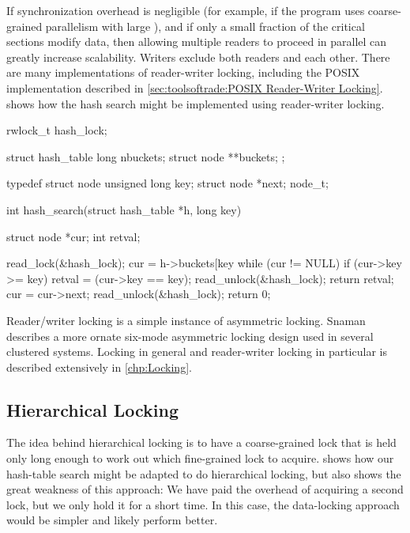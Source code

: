 If synchronization overhead is negligible (for example, if the program
uses coarse-grained parallelism with large ), and if
only a small fraction of the critical sections modify data, then allowing
multiple readers to proceed in parallel can greatly increase scalability.
Writers exclude both readers and each other.
There are many implementations of reader-writer locking, including
the POSIX implementation described in
\cref{sec:toolsoftrade:POSIX Reader-Writer Locking}.
shows how the hash search might be implemented using reader-writer locking.

\begin{listing}
\begin{VerbatimL}[commandchars=\\\@\$]
rwlock_t hash_lock;

struct hash_table
{
	long nbuckets;
	struct node **buckets;
};

typedef struct node {
	unsigned long key;
	struct node *next;
} node_t;

int hash_search(struct hash_table *h, long key)
{
	struct node *cur;
	int retval;

	read_lock(&hash_lock);
	cur = h->buckets[key %
	while (cur != NULL) {
		if (cur->key >= key) {
			retval = (cur->key == key);
			read_unlock(&hash_lock);
			return retval;
		}
		cur = cur->next;
	}
	read_unlock(&hash_lock);
	return 0;
}
\end{VerbatimL}
\caption{Reader-Writer-Locking Hash Table Search}
\label{lst:SMPdesign:Reader-Writer-Locking Hash Table Search}
\end{listing}

Reader/writer locking is a simple instance of asymmetric locking.
Snaman~\cite{Snaman87} describes a more ornate six-mode
asymmetric locking design used in several clustered systems.
Locking in general and reader-writer locking in particular is described
extensively in
\cref{chp:Locking}.

\subsection{Hierarchical Locking}
\label{sec:SMPdesign:Hierarchical Locking}

The idea behind hierarchical locking is to have a coarse-grained lock
that is held only long enough to work out which fine-grained lock
to acquire.
shows how our hash-table search might be adapted to do hierarchical
locking, but also shows the great weakness of this approach:
We have paid the overhead of acquiring a second lock, but we only
hold it for a short time.
In this case, the data-locking approach would be simpler
and likely perform better.

